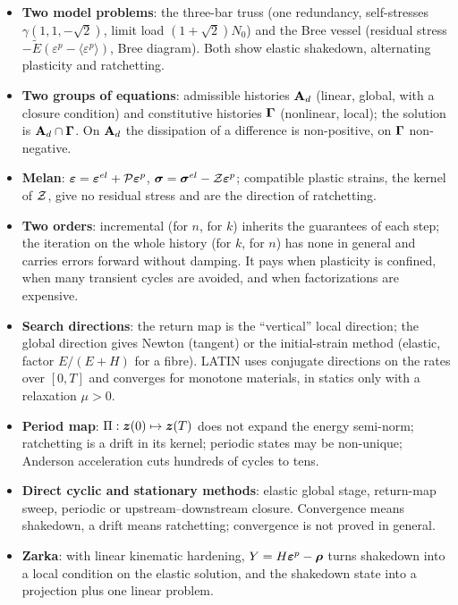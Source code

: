 \begin{gbox*}
\begin{itemize}
  \item \textbf{Two model problems}: the three-bar truss (one redundancy,
  self-stresses $\gamma(1,1,-\sqrt2)$, limit load $(1+\sqrt2)N_0$) and the Bree
  vessel (residual stress $-\tilde E(\varepsilon^p-\langle\varepsilon^p\rangle)$,
  Bree diagram). Both show elastic shakedown, alternating plasticity and
  ratchetting.
  \item \textbf{Two groups of equations}: admissible histories $\mathbf{A}_{d}$ (linear,
  global, with a closure condition) and constitutive histories $\boldsymbol{\Gamma}$
  (nonlinear, local); the solution is $\mathbf{A}_{d}\cap\boldsymbol{\Gamma}$. On $\mathbf{A}_{d}$ the dissipation
  of a difference is non-positive, on $\boldsymbol{\Gamma}$ non-negative.
  \item \textbf{Melan}: $\bm{\varepsilon}=\bm{\varepsilon}^{el}+\mathcal{P}\bm{\varepsilon}^{p}$, $\bm{\sigma}=\bm{\sigma}^{el}-\mathcal{Z}\bm{\varepsilon}^{p}$;
  compatible plastic strains, the kernel of $\mathcal{Z}$, give no residual stress and
  are the direction of ratchetting.
  \item \textbf{Two orders}: incremental (for $n$, for $k$) inherits the
  guarantees of each step; the iteration on the whole history (for $k$, for
  $n$) has none in general and carries errors forward without damping. It
  pays when plasticity is confined, when many transient cycles are avoided,
  and when factorizations are expensive.
  \item \textbf{Search directions}: the return map is the ``vertical'' local
  direction; the global direction gives Newton (tangent) or the initial-strain
  method (elastic, factor $E/(E+H)$ for a fibre). LATIN uses conjugate
  directions on the rates over $[0,T]$ and converges for monotone materials,
  in statics only with a relaxation $\mu>0$.
  \item \textbf{Period map}: $\Pi:\bm{z}(0)\mapsto\bm{z}(T)$ does not expand the
  energy semi-norm; ratchetting is a drift in its kernel; periodic states
  may be non-unique; Anderson acceleration cuts hundreds of cycles to tens.
  \item \textbf{Direct cyclic and stationary methods}: elastic global stage,
  return-map sweep, periodic or upstream--downstream closure. Convergence
  means shakedown, a drift means ratchetting; convergence is not proved in
  general.
  \item \textbf{Zarka}: with linear kinematic hardening, $Y=H\bm{\varepsilon}^{p}-\bm{\rho}$ turns
  shakedown into a local condition on the elastic solution, and the shakedown
  state into a projection plus one linear problem.
\end{itemize}
\end{gbox*}

